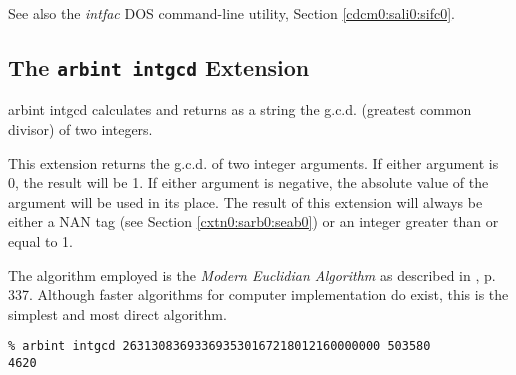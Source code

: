 \begin{tclcommandseealso}
See also the \emph{intfac} DOS command-line utility, 
Section \cdcmzeroxrefhyphen{}\ref{cdcm0:sali0:sifc0}.
\end{tclcommandseealso}


\subsection{The \texttt{arbint intgcd} Extension}
\label{cxtn0:sarb0:sgcd0}

\begin{tclcommandname}{arbint intgcd}%
calculates and returns as a string the g.c.d. 
(greatest common divisor) of two integers.
\end{tclcommandname}

\begin{tclcommandsynopsis}
\end{tclcommandsynopsis}

\begin{tclcommanddescription}
This extension returns the g.c.d. of two integer arguments.
If either argument is 0, the result will be 1.  If either
argument is negative, the absolute value of the argument
will be used in its place.  The result of this 
extension will always be either a NAN tag
(see Section \ref{cxtn0:sarb0:seab0}) 
or an integer greater than or equal to 1.

The algorithm employed is the
\emph{Modern Euclidian Algorithm} as
described in \cite{bibref:b:knuthclassic2ndedvol2}, p. 337.
Although faster algorithms for computer
implementation do exist, this is the simplest
and most direct algorithm.
\end{tclcommanddescription}

\begin{tclcommandsampleinvocations}
\begin{scriptsize}
\begin{verbatim}
% arbint intgcd 263130836933693530167218012160000000 503580
4620
\end{verbatim}
\end{scriptsize}
\end{tclcommandsampleinvocations}

